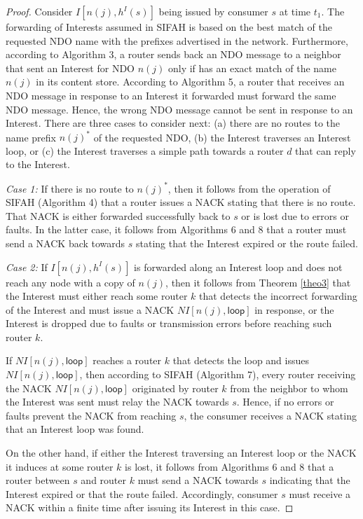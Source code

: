 \documentclass{ancs15-alternate}
\begin{document}
\begin{proof}
Consider  
$I[n(j), h^I (s) ]$ being issued by consumer $s$ at time $t_1$. 
The forwarding of Interests assumed in SIFAH is based on the best match of the requested NDO name with the prefixes advertised in the network. Furthermore, according to Algorithm 3, a router sends back an NDO message to a neighbor that sent an Interest for NDO $n(j)$ only if has an exact match of the name $n(j)$ in its content store. According to Algorithm 5, a router that receives an NDO message in response to an Interest it forwarded must forward the same NDO message. Hence, the wrong NDO message cannot be sent in response to an Interest.
There are three cases to consider next: (a) there are no routes to the name prefix $n(j)^*$ of the requested NDO, (b) the Interest  traverses an Interest loop, or (c) the Interest traverses a simple path towards a router $d$ that can reply to the Interest. 

{\em Case 1:} If there is no route to $n(j)^*$, then it follows from the operation of SIFAH (Algorithm 4) that a router issues a NACK stating that there is no route. That NACK is either forwarded successfully back to $s$ or is lost due to errors or faults. In the latter case, it follows from Algorithms 6 and 8 that a router must send a NACK back towards $s$ stating that the Interest expired or the route failed. 

{\em Case 2:}  If $I[n(j), h^I (s) ]$  is forwarded along an Interest loop and does not reach any node with a copy of $n(j)$, then it follows from  Theorem \ref{theo3} that the Interest must either reach some router $k$ that detects the incorrect forwarding of the Interest and must issue a NACK $NI[n(j), \mathsf{loop} ]$ in response, or the Interest is dropped due to faults or transmission errors before reaching such router $k$.

If $NI[n(j), \mathsf{loop} ]$ reaches a router $k$ that detects the loop and issues  $NI[n(j), \mathsf{loop} ]$,  then
according to SIFAH (Algorithm 7), every router receiving the NACK $NI[n(j), \mathsf{loop} ]$ originated by router $k$ from the neighbor to whom the Interest was sent must relay 
the NACK towards $s$. Hence, if no errors or faults prevent the NACK from reaching $s$, the consumer receives a NACK stating that an Interest loop was found.

On the other hand, if either the Interest traversing an Interest loop or the NACK it induces at some router $k$ is lost, it follows from Algorithms 6 and 8 that a router between $s$ and  router $k$ must send a NACK towards $s$ indicating  that the Interest expired or that the route failed. Accordingly,  consumer $s$ must receive a NACK within a finite time after issuing its Interest in this case.


\end{proof}
\end{document}
